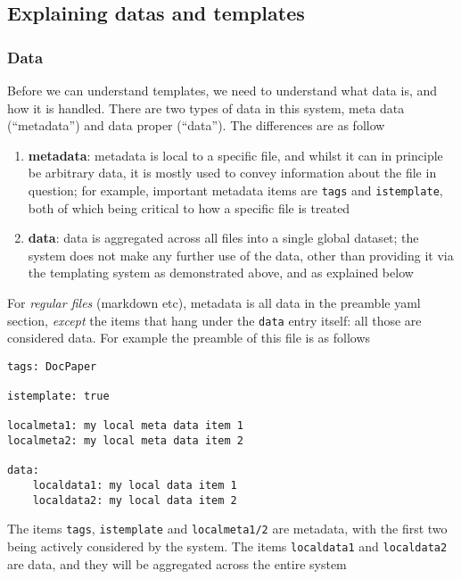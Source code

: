 \documentclass[11pt]{article}
\begin{document}
\hypertarget{explaining-datas-and-templates}{%
\subsection{Explaining datas and
templates}\label{explaining-datas-and-templates}}

\hypertarget{data}{%
\subsubsection{Data}\label{data}}

Before we can understand templates, we need to understand what data is,
and how it is handled. There are two types of data in this system, meta
data (``metadata'') and data proper (``data''). The differences are as
follow

\begin{enumerate}
\def\labelenumi{\arabic{enumi}.}
\item
  \textbf{metadata}: metadata is local to a specific file, and whilst it
  can in principle be arbitrary data, it is mostly used to convey
  information about the file in question; for example, important
  metadata items are \texttt{tags} and \texttt{istemplate}, both of
  which being critical to how a specific file is treated
\item
  \textbf{data}: data is aggregated across all files into a single
  global dataset; the system does not make any further use of the data,
  other than providing it via the templating system as demonstrated
  above, and as explained below
\end{enumerate}

For \emph{regular files} (markdown etc), metadata is all data in the
preamble yaml section, \emph{except} the items that hang under the
\texttt{data} entry itself: all those are considered data. For example
the preamble of this file is as follows

\begin{verbatim}
tags: DocPaper

istemplate: true

localmeta1: my local meta data item 1
localmeta2: my local meta data item 2

data:
    localdata1: my local data item 1
    localdata2: my local data item 2
\end{verbatim}

The items \texttt{tags}, \texttt{istemplate} and \texttt{localmeta1/2}
are metadata, with the first two being actively considered by the
system. The items \texttt{localdata1} and \texttt{localdata2} are data,
and they will be aggregated across the entire system
\end{document}
